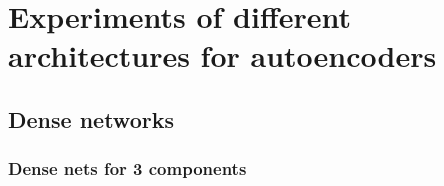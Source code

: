 
\chapter{Experiments of different architectures for autoencoders} %

\label{chapter:AppendixA} %

\section{Dense networks}
\label{section:nn}

\subsection{Dense nets for 3 components}

